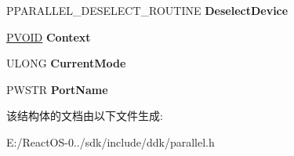 \begin{DoxyCompactItemize}
P\+P\+A\+R\+A\+L\+L\+E\+L\+\_\+\+D\+E\+S\+E\+L\+E\+C\+T\+\_\+\+R\+O\+U\+T\+I\+NE {\bfseries Deselect\+Device}
\item 
\mbox{\label{struct___p_a_r_a_l_l_e_l___p_n_p___i_n_f_o_r_m_a_t_i_o_n_ad5ce15cae12fa57277aa7568f72bb0a9}} 
\hyperlink{interfacevoid}{P\+V\+O\+ID} {\bfseries Context}
\item 
\mbox{\label{struct___p_a_r_a_l_l_e_l___p_n_p___i_n_f_o_r_m_a_t_i_o_n_aaf5486890575b045aba27d99f35ed2ac}} 
U\+L\+O\+NG {\bfseries Current\+Mode}
\item 
\mbox{\label{struct___p_a_r_a_l_l_e_l___p_n_p___i_n_f_o_r_m_a_t_i_o_n_a26d6a4379ad9f6e717bd5bc2a4a3e0a2}} 
P\+W\+S\+TR {\bfseries Port\+Name}
\end{DoxyCompactItemize}


该结构体的文档由以下文件生成\+:\begin{DoxyCompactItemize}
\item 
E\+:/\+React\+O\+S-\/0../sdk/include/ddk/parallel.\+h\end{DoxyCompactItemize}
